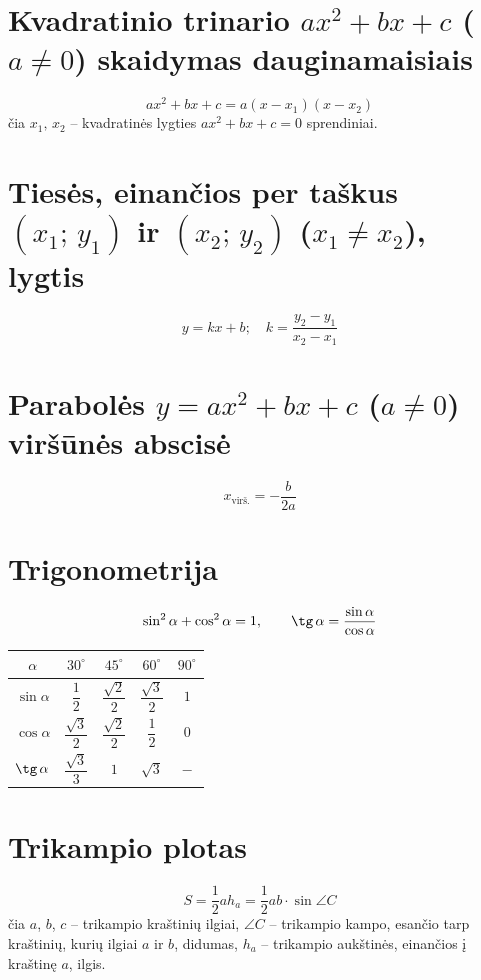 \documentclass[12pt,a4paper]{article}
\begin{document}
\section*{Kvadratinio trinario $ax^2 + bx + c$ ($a \neq 0$) skaidymas dauginamaisiais}

\[
ax^2 + bx + c = a(x - x_1)(x - x_2)
\]
čia $x_1,\, x_2$ -- kvadratinės lygties $ax^2 + bx + c = 0$ sprendiniai.

\section*{Tiesės, einančios per taškus $(x_1;\, y_1)$ ir $(x_2;\, y_2)$ ($x_1 \neq x_2$), lygtis}

\[
y = kx + b; \quad k = \frac{y_2 - y_1}{x_2 - x_1}
\]

\section*{Parabolės $y = ax^2 + bx + c$ ($a \neq 0$) viršūnės abscisė}

\[
x_{\text{virš.}} = -\frac{b}{2a}
\]

\section*{Trigonometrija}

\[
\sin^2\alpha + \cos^2\alpha = 1, \qquad \tg\,\alpha = \frac{\sin\alpha}{\cos\alpha}
\]

\begin{center}
\begin{tabular}{|c|c|c|c|c|}
\hline
$\alpha$ & $30^\circ$ & $45^\circ$ & $60^\circ$ & $90^\circ$ \\
\hline
$\sin\alpha$ & $\dfrac{1}{2}$ & $\dfrac{\sqrt{2}}{2}$ & $\dfrac{\sqrt{3}}{2}$ & $1$ \\[8pt]
\hline
$\cos\alpha$ & $\dfrac{\sqrt{3}}{2}$ & $\dfrac{\sqrt{2}}{2}$ & $\dfrac{1}{2}$ & $0$ \\[8pt]
\hline
$\tg\,\alpha$ & $\dfrac{\sqrt{3}}{3}$ & $1$ & $\sqrt{3}$ & $-$ \\[8pt]
\hline
\end{tabular}
\end{center}

\section*{Trikampio plotas}

\[
S = \frac{1}{2} a h_a = \frac{1}{2} ab \cdot \sin\angle C
\]
čia $a$, $b$, $c$ -- trikampio kraštinių ilgiai, $\angle C$ -- trikampio kampo, esančio tarp kraštinių, kurių ilgiai $a$ ir $b$, didumas, $h_a$ -- trikampio aukštinės, einančios į kraštinę $a$, ilgis.
\end{document}
